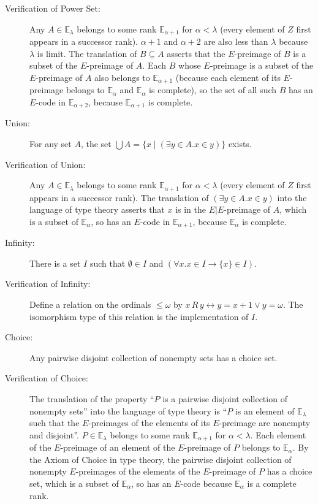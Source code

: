 \documentclass[12pt]{book}
\begin{document}
\begin{description}
\item[Verification of Power Set:] Any $A\in {\mathbb E}_{\lambda}$
belongs to some rank ${\mathbb E}_{\alpha+1}$ for $\alpha<\lambda$
(every element of $Z$ first appears in a successor rank).  $\alpha+1$
and $\alpha+2$ are also less than $\lambda$ because $\lambda$ is
limit.  The translation of $B \subseteq A$ asserts that the
$E$-preimage of $B$ is a subset of the $E$-preimage of $A$.  Each $B$
whose $E$-preimage is a subset of the $E$-preimage of $A$ also belongs
to ${\mathbb E}_{\alpha+1}$ (because each element of its $E$-preimage
belongs to ${\mathbb E}_{\alpha}$ and ${\mathbb E}_{\alpha}$ is
complete), so the set of all such $B$ has an $E$-code in ${\mathbb
E}_{\alpha+2}$, because ${\mathbb E}_{\alpha+1}$ is complete.

\item[Union:] For any set $A$, the set $\bigcup A = \{x \mid (\exists
y \in A.x \in y)\}$ exists.

 \item[Verification of Union:] Any $A\in {\mathbb E}_{\lambda}$
belongs to some rank ${\mathbb E}_{\alpha+1}$ for $\alpha<\lambda$
(every element of $Z$ first appears in a successor rank).  The
translation of $(\exists y \in A.x \in y)$ into the language of type
theory asserts that $x$ is in the $E|E$-preimage of $A$, which is a
subset of ${\mathbb E}_{\alpha}$, so has an $E$-code in ${\mathbb
E}_{\alpha+1}$, because ${\mathbb E}_{\alpha}$ is complete.

\item[Infinity:]  There is a set $I$ such that $\emptyset \in I$
and $(\forall x.x \in I \rightarrow \{x\} \in I)$.  

\item[Verification of Infinity:] Define a relation on the ordinals
$\leq \omega$ by $x\,R\,y \leftrightarrow y=x+1 \vee y=\omega$.  The
isomorphism type of this relation is the implementation of $I$.

\item[Choice:] Any pairwise disjoint collection of nonempty sets has a
choice set.

\item[Verification of Choice:] The translation of the property ``$P$
is a pairwise disjoint collection of nonempty sets'' into the language
of type theory is ``$P$ is an element of ${\mathbb E}_{\lambda}$ such
that the $E$-preimages of the elements of its $E$-preimage are
nonempty and disjoint''.  $P\in {\mathbb E}_{\lambda}$ belongs to some
rank ${\mathbb E}_{\alpha+1}$ for $\alpha<\lambda$.  Each element of
the $E$-preimage of an element of the $E$-preimage of $P$ belongs to
${\mathbb E}_{\alpha}$.  By the Axiom of Choice in type theory, the
pairwise disjoint collection of nonempty $E$-preimages of the elements
of the $E$-preimage of $P$ has a choice set, which is a subset of
${\mathbb E}_{\alpha}$, so has an $E$-code because ${\mathbb
E}_{\alpha}$ is a complete rank.

\end{description}
\end{document}
